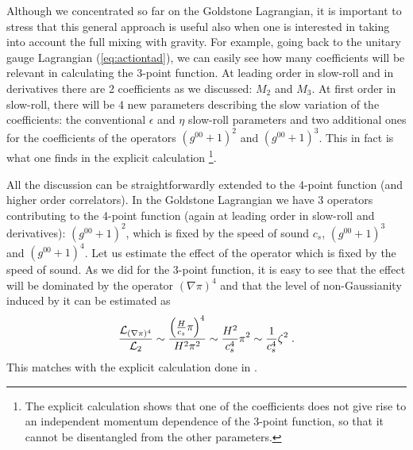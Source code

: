 \documentclass[12pt,letterpaper]{article}
\def\be{\begin{eqnarray}}
\def\ee{\end{eqnarray}}
\begin{document}
{Although we concentrated so far on the Goldstone Lagrangian, it is
important to stress that this general approach is useful also when one
is interested in taking into account the full mixing with gravity. For
example, going back to the unitary gauge Lagrangian
(\ref{eq:actiontad}), we can easily see how many coefficients will be
relevant in calculating the 3-point function. At leading order in
slow-roll and in derivatives there are 2 coefficients as we discussed: $M_2$ and $M_3$. At first order in
slow-roll, there will be 4 new parameters describing the slow
variation of the coefficients: the conventional $\epsilon$ and $\eta$
slow-roll parameters and two additional ones for the coefficients of
the 
operators $(g^{00}+1)^2$ and $(g^{00}+1)^3$. This in fact is what one
finds in the explicit calculation \cite{Chen:2006nt} \footnote{The
  explicit calculation shows that one of the coefficients does not
  give rise to an independent momentum dependence of the 3-point
  function, so that it cannot be disentangled from the other parameters.}.

All the discussion can be straightforwardly extended to the 4-point
function (and higher order correlators). In the Goldstone Lagrangian we
have 3 operators contributing to the 4-point function (again at
leading order in slow-roll and derivatives): $(g^{00}+1)^2$,
which is fixed by the speed of sound $c_s$,  $(g^{00}+1)^3$ and
$(g^{00}+1)^4$. Let us estimate the effect of the operator which is
fixed by the speed of sound. As we did for the 3-point function, it is easy to see
that the effect will be dominated by the operator $(\nabla\pi)^4$ and
that the level of non-Gaussianity induced by it can be estimated as
\be
\frac{{\cal L}_{(\nabla \pi)^4}}{{\cal L}_{2}}\sim \frac{\left(\frac{H}{c_s} \pi\right)^4}{H^2 \pi^2} \sim \frac{H^2}{c^4_s}
\pi^2 \sim \frac{1}{c^4_s} \zeta^2 \;.
\ee
This matches with the explicit calculation done in 
\cite{Huang:2006eh}.







}
\end{document}

